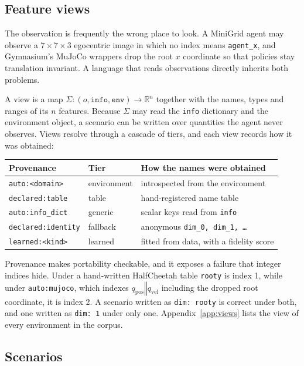 \documentclass{article}
\begin{document}
\subsection{Feature views}
\label{sec:views}

The observation is frequently the wrong place to look. A MiniGrid agent
may observe a $7\times7\times3$ egocentric image in which no index means
\texttt{agent\_x}, and Gymnasium's MuJoCo wrappers drop the root $x$
coordinate so that policies stay translation invariant. A language that
reads observations directly inherits both problems.

A view is a map
$\Sigma:(o,\texttt{info},\texttt{env})\rightarrow\mathbb{R}^{n}$ together
with the names, types and ranges of its $n$ features. Because $\Sigma$
may read the \texttt{info} dictionary and the environment object, a
scenario can be written over quantities the agent never observes. Views
resolve through a cascade of tiers, and each view records how it was
obtained:

\begin{center}
\begin{tabular}{@{}lll@{}}
\toprule
Provenance & Tier & How the names were obtained \\
\midrule
\texttt{auto:<domain>} & environment & introspected from the environment \\
\texttt{declared:table} & table & hand-registered name table \\
\texttt{auto:info\_dict} & generic & scalar keys read from \texttt{info} \\
\texttt{declared:identity} & fallback & anonymous \texttt{dim\_0, dim\_1, \dots} \\
\texttt{learned:<kind>} & learned & fitted from data, with a fidelity score \\
\bottomrule
\end{tabular}
\end{center}

Provenance makes portability checkable, and it exposes a failure that
integer indices hide. Under a hand-written HalfCheetah table
\texttt{rooty} is index 1, while under \texttt{auto:mujoco}, which indexes
$q_{\text{pos}}\mathbin\Vert q_{\text{vel}}$ including the dropped root
coordinate, it is index 2. A scenario written as \texttt{dim: rooty} is
correct under both, and one written as \texttt{dim: 1} under only one.
Appendix~\ref{app:views} lists the view of every environment in the
corpus.

\subsection{Scenarios}
\label{sec:grammar}
\end{document}
